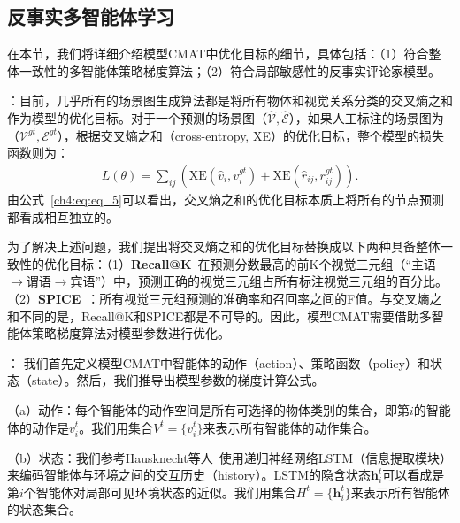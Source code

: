\subsection{反事实多智能体学习}

在本节，我们将详细介绍模型CMAT中优化目标的细节，具体包括：（1）符合整体一致性的多智能体策略梯度算法；（2）符合局部敏感性的反事实评论家模型。


\textbf{}：目前，几乎所有的场景图生成算法都是将所有物体和视觉关系分类的交叉熵之和作为模型的优化目标。对于一个预测的场景图（$\hat{\mathcal{V}}, \hat{\mathcal{E}}$），如果人工标注的场景图为（$\mathcal{V}^{gt}, \mathcal{E}^{gt}$），根据交叉熵之和（cross-entropy, XE）的优化目标，整个模型的损失函数则为：
\begin{equation} \label{ch4:eq:eq_5}
\begin{aligned}
   L(\theta) =  \textstyle{\sum_{ij}} \left(\text{XE}(\hat{v}_i, v^{gt}_i) + \text{XE}(\hat{r}_{ij}, r^{gt}_{ij}) \right). 
\end{aligned}
\end{equation}
由公式~\eqref{ch4:eq:eq_5}可以看出，交叉熵之和的优化目标本质上将所有的节点预测都看成相互独立的。

为了解决上述问题，我们提出将交叉熵之和的优化目标替换成以下两种具备整体一致性的优化目标：（1）\textbf{Recall@K}~\cite{lu2016visual}在预测分数最高的前K个视觉三元组（“主语$\to$谓语$\to$宾语”）中，预测正确的视觉三元组占所有标注视觉三元组的百分比。（2）\textbf{SPICE}~\cite{anderson2016spice}：所有视觉三元组预测的准确率和召回率之间的F值。与交叉熵之和不同的是，Recall@K和SPICE都是不可导的。因此，模型CMAT需要借助多智能体策略梯度算法对模型参数进行优化。


\textbf{}：
我们首先定义模型CMAT中智能体的动作（action）、策略函数（policy）和状态（state）。然后，我们推导出模型参数的梯度计算公式。

（a）动作：每个智能体的动作空间是所有可选择的物体类别的集合，即第$i$的智能体的动作是$v^t_i$。我们用集合$V^t = \{v^t_i\}$来表示所有智能体的动作集合。

（b）状态：我们参考Hausknecht等人~\cite{hausknecht2015deep}使用递归神经网络LSTM（信息提取模块）来编码智能体与环境之间的交互历史（history）。LSTM的隐含状态$\bm{h}^t_i$可以看成是第$i$个智能体对局部可见环境状态的近似。我们用集合$H^t = \{\bm{h}^t_i\}$来表示所有智能体的状态集合。

